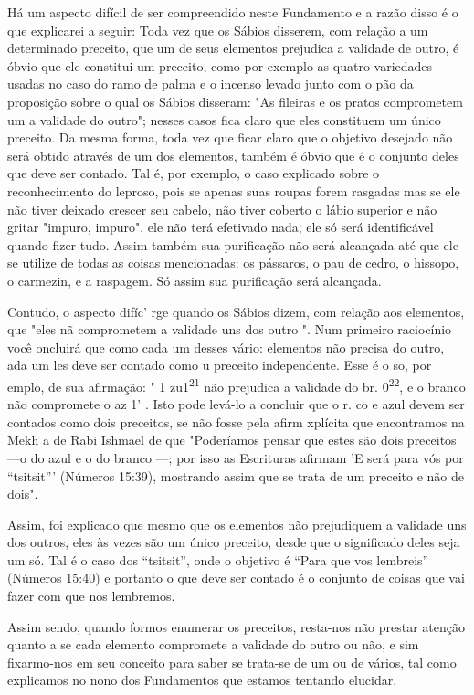Há um aspecto difícil de ser compreendido neste Fundamento e a razão
disso é o que explicarei a seguir: Toda vez que os Sábios disserem, com
relação a um determinado preceito, que um de seus elementos prejudica a
vali­dade de outro, é óbvio que ele constitui um preceito, como por
exemplo as quatro variedades usadas no caso do ramo de palma e o incenso
levado junto com o pão da proposição sobre o qual os Sábios disseram:
"As fileiras e os pra­tos comprometem um a validade do outro"; nesses
casos fica claro que eles constituem um único preceito. Da mesma forma,
toda vez que ficar claro que o objetivo desejado não será obtido através
de um dos elementos, também é óbvio que é o conjunto deles que deve ser
contado. Tal é, por exemplo, o caso explicado sobre o reconhecimento do
leproso, pois se apenas suas roupas fo­rem rasgadas mas se ele não tiver
deixado crescer seu cabelo, não tiver coberto o lábio superior e não
gritar "impuro, impuro", ele não terá efetivado nada; ele só será
identificável quando fizer tudo. Assim também sua purificação não será
alcançada até que ele se utilize de todas as coisas mencionadas: os
pássa­ros, o pau de cedro, o hissopo, o carmezin, e a raspagem. Só assim
sua purifica­ção será alcançada.

Contudo, o aspecto difíc' rge quando os Sábios dizem, com rela­ção aos
elementos, que "eles nã comprometem a validade uns dos outro ". Num
primeiro raciocínio você oncluirá que como cada um desses vário:
ele­mentos não precisa do outro, ada um les deve ser contado como u
pre­ceito independente. Esse é o so, por emplo, de sua afirmação: " 1
zu1\textsuperscript{21} não prejudica a validade do br.
0\textsuperscript{22}, e o branco não compromete o az 1' . Isto pode
levá-lo a concluir que o r. co e azul devem ser contados como dois
preceitos, se não fosse pela afirm xplícita que encontramos na Mekh a de
Rabi Ishmael de que "Poderíamos pensar que estes são dois preceitos ---o
do azul e o do branco ---; por isso as Escrituras afirmam 'E será para
vós por ``tsitsit''' (Números 15:39), mostrando assim que se trata de um
preceito e não de dois".

Assim, foi explicado que mesmo que os elementos não prejudiquem a
validade uns dos outros, eles às vezes são um único preceito, desde que
o significado deles seja um só. Tal é o caso dos ``tsitsit'', onde o
objetivo é ``Para que vos lembreis'' (Números 15:40) e portanto o que deve
ser contado é o con­junto de coisas que vai fazer com que nos lembremos.

Assim sendo, quando formos enumerar os preceitos, resta-nos não prestar
atenção quanto a se cada elemento compromete a validade do outro ou não,
e sim fixarmo-nos em seu conceito para saber se trata-se de um ou de
vários, tal como explicamos no nono dos Fundamentos que estamos tentando
elucidar.


